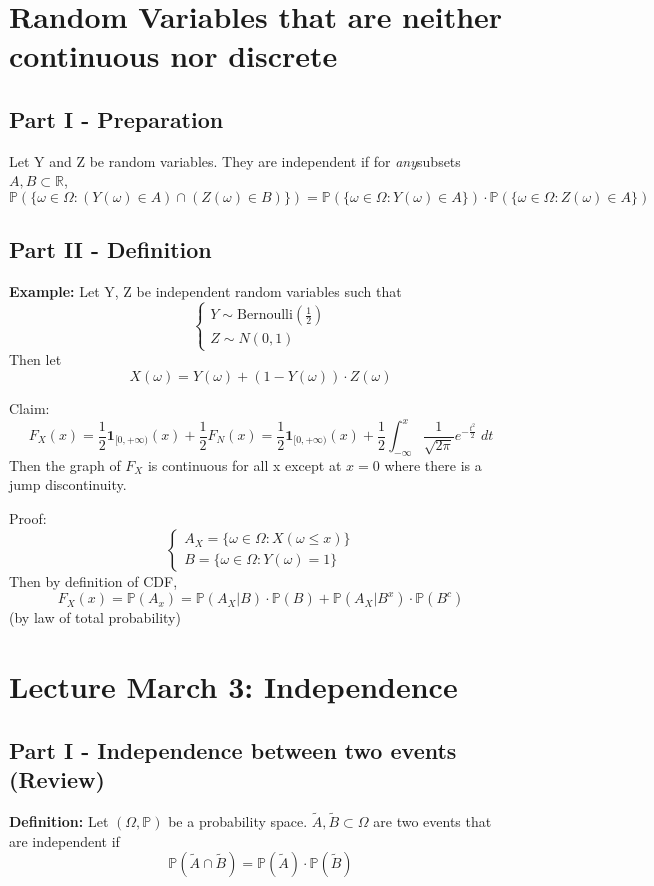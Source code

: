 \documentclass[12pt]{article}
\renewcommand{\P}{\mathbb{P}}
\newcommand{\R}{\mathbb{R}}
\begin{document}
\section*{Random Variables that are neither continuous nor discrete}
\subsection*{Part I - Preparation}
Let Y and Z be random variables. They are independent if for \emph{any}subsets $A, B \subset \R$,
\[\P(\{\omega \in \Omega : (Y(\omega) \in A) \cap (Z(\omega) \in B)\}) = \P(\{\omega \in \Omega : Y(\omega) \in A\}) \cdot  \P(\{\omega \in \Omega : Z(\omega) \in A\})\]

\subsection*{Part II - Definition}
\textbf{Example:} Let Y, Z be independent random variables such that 
\[\begin{cases}
    Y \sim \text{Bernoulli}(\frac{1}{2})\\
    Z \sim N(0, 1)
\end{cases}\] 
Then let
\[X(\omega) = Y(\omega) + (1 - Y(\omega))\cdot Z(\omega)\]

Claim:
\[F_X(x) = \frac{1}{2}\mathbf{1}_{[0, +\infty)}(x) + \frac{1}{2}F_N(x) = \frac{1}{2}\mathbf{1}_{[0, +\infty)}(x) + \frac{1}{2}\int_{-\infty}^x \frac{1}{\sqrt{2\pi}}e^{-\frac{t^2}{2}}\; dt \]
Then the graph of $F_X$ is continuous for all x except at $x = 0$ where there is a jump discontinuity.

Proof: 
\[\begin{cases}
    A_X = \{\omega \in \Omega: X(\omega \leq x)\}\\
    B = \{\omega \in \Omega: Y(\omega) = 1\}
\end{cases}\]
Then by definition of CDF,
\[F_X(x) = \P(A_x) = \P(A_X |B)\cdot \P(B) + \P(A_X|B^x)\cdot \P(B^c)\]
(by law of total probability)

\section*{Lecture March 3: Independence}
\subsection*{Part I - Independence between two events (Review)}
\textbf{Definition:} Let $(\Omega, \P)$ be a probability space. $\tilde{A}, \tilde{B} \subset \Omega$ are two events that are independent if 
\[\P(\tilde{A} \cap \tilde{B}) = \P(\tilde{A}) \cdot \P(\tilde{B})\]
\end{document}

